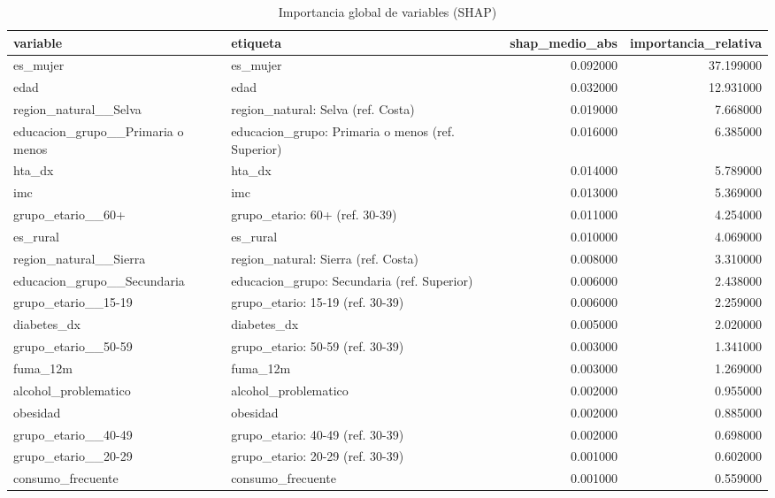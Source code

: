 \begin{table}[htbp]
\caption{Importancia global de variables (SHAP)}
\label{tab:tabla_29_importancia_shap}
\begin{tabular}{llrr}
\toprule
variable & etiqueta & shap\_medio\_abs & importancia\_relativa \\
\midrule
es\_mujer & es\_mujer & 0.092000 & 37.199000 \\
edad & edad & 0.032000 & 12.931000 \\
region\_natural\_\_Selva & region\_natural: Selva (ref. Costa) & 0.019000 & 7.668000 \\
educacion\_grupo\_\_Primaria o menos & educacion\_grupo: Primaria o menos (ref. Superior) & 0.016000 & 6.385000 \\
hta\_dx & hta\_dx & 0.014000 & 5.789000 \\
imc & imc & 0.013000 & 5.369000 \\
grupo\_etario\_\_60+ & grupo\_etario: 60+ (ref. 30-39) & 0.011000 & 4.254000 \\
es\_rural & es\_rural & 0.010000 & 4.069000 \\
region\_natural\_\_Sierra & region\_natural: Sierra (ref. Costa) & 0.008000 & 3.310000 \\
educacion\_grupo\_\_Secundaria & educacion\_grupo: Secundaria (ref. Superior) & 0.006000 & 2.438000 \\
grupo\_etario\_\_15-19 & grupo\_etario: 15-19 (ref. 30-39) & 0.006000 & 2.259000 \\
diabetes\_dx & diabetes\_dx & 0.005000 & 2.020000 \\
grupo\_etario\_\_50-59 & grupo\_etario: 50-59 (ref. 30-39) & 0.003000 & 1.341000 \\
fuma\_12m & fuma\_12m & 0.003000 & 1.269000 \\
alcohol\_problematico & alcohol\_problematico & 0.002000 & 0.955000 \\
obesidad & obesidad & 0.002000 & 0.885000 \\
grupo\_etario\_\_40-49 & grupo\_etario: 40-49 (ref. 30-39) & 0.002000 & 0.698000 \\
grupo\_etario\_\_20-29 & grupo\_etario: 20-29 (ref. 30-39) & 0.001000 & 0.602000 \\
consumo\_frecuente & consumo\_frecuente & 0.001000 & 0.559000 \\
\bottomrule
\end{tabular}
\end{table}
